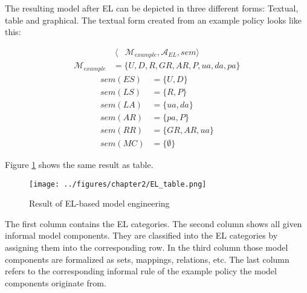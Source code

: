 \documentclass[twoside, openright, 12pt]{book}
\begin{document}


\noindent
The resulting model after EL can be depicted in three different forms: Textual, table and graphical.
The textual form created from an example policy looks like this:

\begin{align*}
\langle &\mathcal{M}_{example}, \mathcal{A}_{EL}, sem \rangle
\end{align*}
\begin{align*}
\mathcal{M}_{example} &= \lbrace U, D, R, GR, AR, P, ua, da, pa \rbrace
\end{align*}
\begin{align*}
sem(ES) &= \lbrace U, D \rbrace\\
sem(LS) &= \lbrace R, P \rbrace\\
sem(LA) &= \lbrace ua, da \rbrace\\
sem(AR) &= \lbrace pa, P \rbrace\\
sem(RR) &= \lbrace GR, AR, ua \rbrace\\
sem(MC) &= \lbrace \emptyset \rbrace
\end{align*}

\noindent
Figure \ref{fig:EL_table} shows the same result as table.

\begin{figure}[htb]
	\centering
	\texttt{[image: ../figures/chapter2/EL\_table.png]}
	\caption{Result of EL-based model engineering \cite[p.77, table 4.1]{Amthor18}}
	\label{fig:EL_table}
\end{figure}

\noindent
The first column contains the EL categories.
The second column shows all given informal model components.
They are classified into the EL categories by assigning them into the corresponding row.
In the third column those model components are formalized as sets, mappings, relations, etc.
The last column refers to the corresponding informal rule of the example policy the model components originate from.
\end{document}
